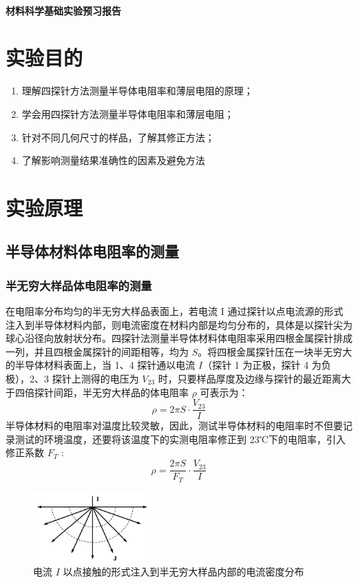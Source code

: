 \documentclass[a4paper,utf8]{article}
\begin{document}
\begin{center}
    {\mbox{}\\[7em]\bfseries\songti%
    材料科学基础实验预习报告}\\[34mm]
\end{center}
\newpage
\section{实验目的}
    \begin{enumerate}
        \item 理解四探针方法测量半导体电阻率和薄层电阻的原理；
        \item 学会用四探针方法测量半导体电阻率和薄层电阻；
        \item 针对不同几何尺寸的样品，了解其修正方法；
        \item 了解影响测量结果准确性的因素及避免方法
    \end{enumerate}
\section{实验原理}%
    \subsection{半导体材料体电阻率的测量}
        \subsubsection{半无穷大样品体电阻率的测量}
            在电阻率分布均匀的半无穷大样品表面上，若电流 I 通过探针以点电流源的形式注入到半导体材料内部，则电流密度在材料内部是均匀分布的，具体是以探针尖为球心沿径向放射状分布。四探针法测量半导体材料体电阻率采用四根金属探针排成一列，并且四根金属探针的间距相等，均为 $S$。将四根金属探针压在一块半无穷大的半导体材料表面上，当 1、4 探针通以电流 $I$（探针 1 为正极，探针 4 为负极），2、3 探针上测得的电压为 $V_{23}$ 时，只要样品厚度及边缘与探针的最近距离大于四倍探针间距，半无穷大样品的体电阻率 $\rho$ 可表示为：
            \begin{equation}
                \rho = 2\pi S\cdot\frac{V_{23}}{I} \label{eq:0}
            \end{equation}
            半导体材料的电阻率对温度比较灵敏，因此，测试半导体材料的电阻率时不但要记录测试的环境温度，还要将该温度下的实测电阻率修正到 23℃下的电阻率，引入修正系数 $F_T$ : 
            \begin{equation}
                \rho =\frac{2\pi S}{F_T}\cdot\frac{V_{23}}{I}
            \end{equation}
            \begin{figure}[!ht]
                \includegraphics[width=0.4\textwidth]{1.jpg}
                \caption{电流 $I$ 以点接触的形式注入到半无穷大样品内部的电流密度分布}
            \end{figure}
\end{document}
